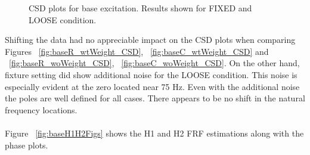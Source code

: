 \documentclass[paper=a4, fontsize=12pt]{scrartcl} %
\begin{document}
	\begin{figure}[H]
		\centering
		\quad
		\quad
		\quad
		\caption{CSD plots for base excitation. Results shown for FIXED and LOOSE 					condition.}
		\label{fig:baseCSDFigs}
	\end{figure}
%
Shifting the data had no appreciable impact on the CSD plots when comparing Figures ~\ref{fig:baseR_wtWeight_CSD}, ~\ref{fig:baseC_wtWeight_CSD} and ~\ref{fig:baseR_woWeight_CSD}, ~\ref{fig:baseC_woWeight_CSD}. On the other hand, fixture setting did show additional noise for the LOOSE condition. This noise is especially evident at the zero located near 75 Hz. Even with the additional noise the poles are well defined for all cases. There appears to be no shift in the natural frequency locations.
\\
\\
Figure ~\ref{fig:baseH1H2Figs} shows the H1 and H2 FRF estimations along with the phase plots.
\end{document}
